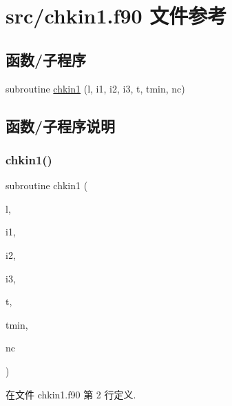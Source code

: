 \hypertarget{chkin1_8f90}{}\section{src/chkin1.f90 文件参考}
\label{chkin1_8f90}
\subsection*{函数/子程序}
\begin{DoxyCompactItemize}
\item 
subroutine \mbox{\hyperlink{chkin1_8f90_a62d15a7364fc7494ee0e68273be50064}{chkin1}} (l, i1, i2, i3, t, tmin, nc)
\end{DoxyCompactItemize}


\subsection{函数/子程序说明}
\mbox{\label{chkin1_8f90_a62d15a7364fc7494ee0e68273be50064}} 
\subsubsection{\texorpdfstring{chkin1()}{chkin1()}}
{\footnotesize\ttfamily subroutine chkin1 (\begin{DoxyParamCaption}\item[{}]{l,  }\item[{}]{i1,  }\item[{}]{i2,  }\item[{}]{i3,  }\item[{}]{t,  }\item[{}]{tmin,  }\item[{}]{nc }\end{DoxyParamCaption})}



在文件 chkin1.\+f90 第 2 行定义.

